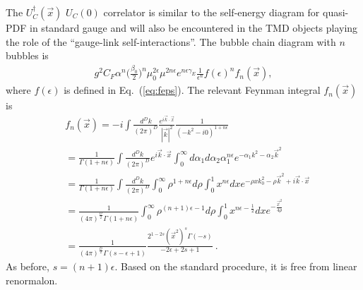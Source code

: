 \documentclass[a4paper,11pt]{article}
\begin{document}
The $U_{C}^{\dagger}(\vec{x})$ $U_{C}(0)$ correlator is similar to the self-energy diagram for quasi-PDF in standard gauge and will also be encountered in the TMD objects playing the role of the ``gauge-link self-interactions''.  The bubble chain diagram with $n$ bubbles is
\begin{align}
g^2C_F\alpha^n\bigg(\frac{\beta_0}{2}\bigg)^n\mu_0^{2\epsilon}\mu^{2n\epsilon}e^{n\epsilon \gamma_E}\frac{1}{\epsilon^n}f(\epsilon)^n f_n(\vec{x}),
\end{align}
where $f(\epsilon)$ is defined in Eq.~(\ref{eq:feps}). The relevant Feynman integral $f_n(\vec{x})$ is 
\begin{align}
&f_n(\vec{x})=-i\int \frac{d^Dk}{(2\pi)^D} \frac{e^{i\vec{k}\cdot \vec{x}}}{|\vec{k}|^2}\frac{1}{(-k^2-i0)^{1+n\epsilon}}\nonumber \\ 
&=\frac{1}{\Gamma(1+n\epsilon)}\int \frac{d^Dk}{(2\pi)^D} e^{i\vec{k}\cdot \vec{x}}\int_{0}^{\infty} d\alpha_1d\alpha_2 \alpha_1^{n\epsilon} e^{-\alpha_1 k^2-\alpha_2\vec{k}^2} \nonumber \\
&=\frac{1}{\Gamma(1+n\epsilon)}\int \frac{d^Dk}{(2\pi)^D} \int_{0}^{\infty} \rho^{1+n\epsilon}d\rho\int_{0}^1x^{n\epsilon}dxe^{-\rho x k_0^2-\rho \vec{k}^2+i\vec{k}\cdot \vec{x}} \nonumber \\ 
&=\frac{1}{(4\pi)^{\frac{D}{2}}\Gamma(1+n\epsilon)}\int_{0}^{\infty} \rho^{(n+1)\epsilon-1}d\rho\int_{0}^1x^{n\epsilon-\frac{1}{2}}dxe^{-\frac{\vec{x}^2}{4\rho}} \nonumber \\ 
&=\frac{1}{(4\pi)^{\frac{D}{2}}\Gamma(s-\epsilon+1)}\frac{2^{1-2 s} \left(\vec{x}^2\right)^{s} \Gamma (-s)}{-2 \epsilon+2 s+1} \ .
\end{align}
As before, $s=(n+1)\epsilon$. Based on the standard procedure, it is free from linear renormalon.  


 

\end{document}

